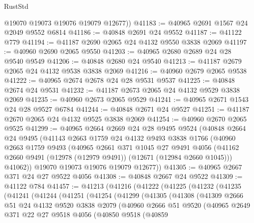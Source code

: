 \begin{lexlean}{RustStd}
\begin{coremodule}
        @19070
        @19073
        @19076
        @19079
        @12677))
@41183 := @40965 @2691 @1567 @24 @2049 @9552 @6814
@41186 := @40848 @2691 @24 @9552
@41187 := @41122 @779
@41194 := @41187 @2690 @2065 @24 @4132 @9550 @3838 @2069
@41197 := @40960 @2690 @2065 @9550
@41203 := @40965 @2680 @2689 @24 @28 @9540 @9549
@41206 := @40848 @2680 @24 @9540
@41213 := @41187 @2679 @2065 @24 @4132 @9538 @3838 @2069
@41216 := @40960 @2679 @2065 @9538
@41222 := @40965 @2674 @2678 @24 @28 @9531 @9537
@41225 := @40848 @2674 @24 @9531
@41232 := @41187 @2673 @2065 @24 @4132 @9529 @3838 @2069
@41235 := @40960 @2673 @2065 @9529
@41241 := @40965 @2671 @1543 @24 @28 @9527 @6784
@41244 := @40848 @2671 @24 @9527
@41251 := @41187 @2670 @2065 @24 @4132 @9525 @3838 @2069
@41254 := @40960 @2670 @2065 @9525
@41299 := @40965
    @2664
    @2669
    @24
    @28
    @9495
    @9524
    (@40848
      @2664
      @24
      @9495
      (@41143
        @2663
        @1759
        @24
        @4132
        @9493
        @3838
        @1766
        (@40960
          @2663
          @1759
          @9493
          (@40965
            @2661
            @371
            @1045
            @27
            @9491
            @4056
            (@41162 @2660 @9491 (@12978 (@12979 @9491)) (@12671 (@12984 @2660 @1045)))
            @41062))
        @19070
        @19073
        @19076
        @19079
        @12677))
@41305 := @40965 @2667 @371 @24 @27 @9522 @4056
@41308 := @40848 @2667 @24 @9522
@41309 := @41122 @784
@41457 := @41213
    (@41216
      (@41222
        (@41225
          (@41232
            (@41235
              (@41241
                (@41244
                  (@41251
                    (@41254
                      (@41299
                        (@41305
                          (@41308
                            (@41309
                              @2666
                              @51
                              @24
                              @4132
                              @9520
                              @3838
                              @2079
                              (@40960
                                @2666
                                @51
                                @9520
                                (@40965
                                  @2649
                                  @371
                                  @22
                                  @27
                                  @9518
                                  @4056
                                  (@40850
                                    @9518
                                    (@40859

\end{coremodule}
\end{lexlean}
